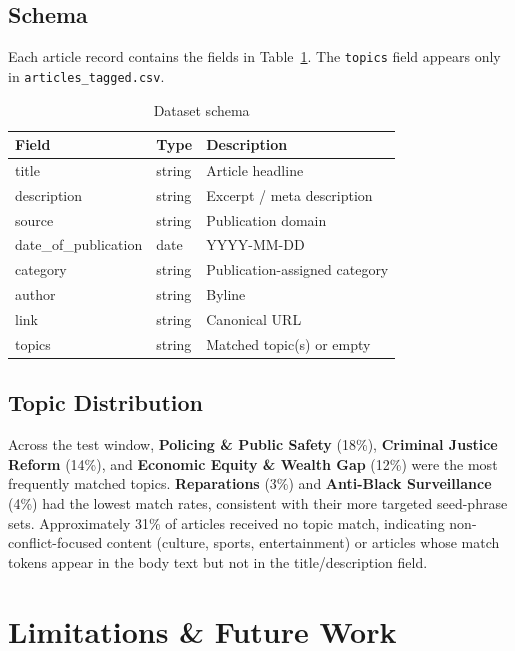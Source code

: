 \documentclass[sigconf,anonymous,review]{acmart}
\begin{document}
\subsection{Schema}

Each article record contains the fields in Table~\ref{tab:schema}.
The \texttt{topics} field appears only in \texttt{articles\_tagged.csv}.

\begin{table}[h]
\caption{Dataset schema}
\label{tab:schema}
\small
\begin{tabular}{lll}
\toprule
\textbf{Field} & \textbf{Type} & \textbf{Description} \\
\midrule
title               & string & Article headline \\
description         & string & Excerpt / meta description \\
source              & string & Publication domain \\
date\_of\_publication & date   & YYYY-MM-DD \\
category            & string & Publication-assigned category \\
author              & string & Byline \\
link                & string & Canonical URL \\
topics              & string & Matched topic(s) or empty \\
\bottomrule
\end{tabular}
\end{table}

\subsection{Topic Distribution}

Across the test window, \textbf{Policing \& Public Safety} (18\%),
\textbf{Criminal Justice Reform} (14\%), and \textbf{Economic Equity \&
Wealth Gap} (12\%) were the most frequently matched topics.
\textbf{Reparations} (3\%) and \textbf{Anti-Black Surveillance} (4\%) had the
lowest match rates, consistent with their more targeted seed-phrase sets.
Approximately 31\% of articles received no topic match, indicating
non-conflict-focused content (culture, sports, entertainment) or articles whose
match tokens appear in the body text but not in the title/description field.

\section{Limitations \& Future Work}
\end{document}
